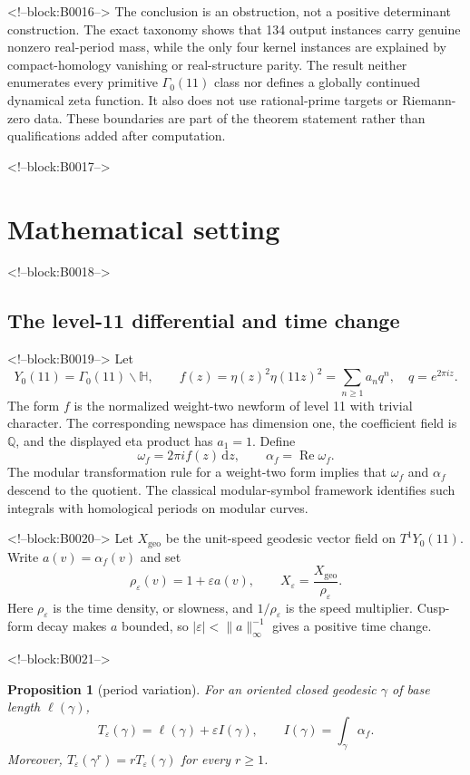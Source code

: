 \documentclass[11pt]{article}
\newtheorem{proposition}[theorem]{Proposition}
\theoremstyle{definition}
\theoremstyle{remark}
\newcommand{\G}{\Gamma_0(11)}
\newcommand{\HH}{\mathbb H}
\newcommand{\QQ}{\mathbb Q}
\newcommand{\e}{\varepsilon}
\newcommand{\dd}{\,\mathrm d}
\begin{document}
<!--block:B0016-->
The conclusion is an obstruction, not a positive determinant construction. The exact taxonomy shows that 134 output instances carry genuine nonzero real-period mass, while the only four kernel instances are explained by compact-homology vanishing or real-structure parity. The result neither enumerates every primitive $\G$ class nor defines a globally continued dynamical zeta function. It also does not use rational-prime targets or Riemann-zero data. These boundaries are part of the theorem statement rather than qualifications added after computation.

<!--block:B0017-->
\section{Mathematical setting}

<!--block:B0018-->
\subsection{The level-11 differential and time change}

<!--block:B0019-->
Let
\[
Y_0(11)=\G\backslash\HH,
\qquad
f(z)=\eta(z)^2\eta(11z)^2=\sum_{n\geq1}a_nq^n,
\quad q=e^{2\pi iz}.
\]
The form $f$ is the normalized weight-two newform of level 11 with trivial character. The corresponding newspace has dimension one, the coefficient field is $\QQ$, and the displayed eta product has $a_1=1$.
\citep[Properties and q-expansion]{lmfdb112aa}
Define
\[
\omega_f=2\pi i f(z)\dd z,
\qquad
\alpha_f=\operatorname{Re}\omega_f.
\]
The modular transformation rule for a weight-two form implies that $\omega_f$ and $\alpha_f$ descend to the quotient. The classical modular-symbol framework identifies such integrals with homological periods on modular curves.
\citep[pp.~19--25]{manin1972}

<!--block:B0020-->
Let $X_{\mathrm{geo}}$ be the unit-speed geodesic vector field on $T^1Y_0(11)$. Write $a(v)=\alpha_f(v)$ and set
\[
\rho_\e(v)=1+\e a(v),
\qquad
X_\e=\frac{X_{\mathrm{geo}}}{\rho_\e}.
\]
Here $\rho_\e$ is the time density, or slowness, and $1/\rho_\e$ is the speed multiplier. Cusp-form decay makes $a$ bounded, so $|\e|<\lVert a\rVert_\infty^{-1}$ gives a positive time change.

<!--block:B0021-->
\begin{proposition}[period variation]\label{prop:period}
For an oriented closed geodesic $\gamma$ of base length $\ell(\gamma)$,
\[
T_\e(\gamma)=\ell(\gamma)+\e I(\gamma),
\qquad
I(\gamma)=\int_\gamma\alpha_f.
\]
Moreover, $T_\e(\gamma^r)=rT_\e(\gamma)$ for every $r\geq1$.
\end{proposition}
\end{document}
